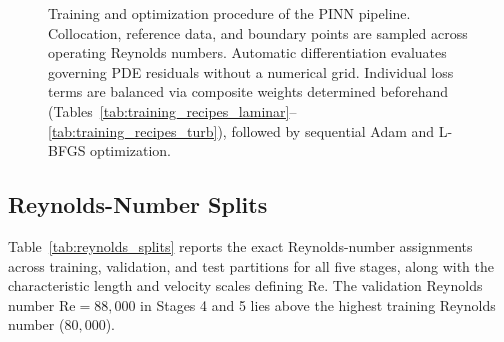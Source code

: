 \documentclass[11pt,a4paper]{article}
\begin{document}
\begin{figure}[H]
{%
}
\caption{Training and optimization procedure of the PINN pipeline. Collocation, reference data, and boundary points are sampled across operating Reynolds numbers. Automatic differentiation evaluates governing PDE residuals without a numerical grid. Individual loss terms are balanced via composite weights determined beforehand (Tables~\ref{tab:training_recipes_laminar}--\ref{tab:training_recipes_turb}), followed by sequential Adam and L-BFGS optimization.}
\label{fig:training_flowchart}
\end{figure}






\subsection{Reynolds-Number Splits}
\label{sec:reynolds_splits}
Table~\ref{tab:reynolds_splits} reports the exact Reynolds-number assignments across training, validation, and test partitions for all five stages, along with the characteristic length and velocity scales defining $\mathrm{Re}$. The validation Reynolds number $\mathrm{Re}=88{,}000$ in Stages 4 and 5 lies above the highest training Reynolds number ($80{,}000$).
\end{document}
